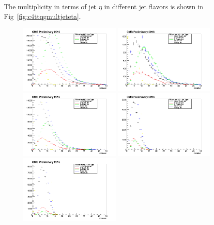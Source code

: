The multiplicity in terms of jet $\eta$ in different jet flavors is shown in Fig~\ref{fig:c4ttqgmultjeteta}.
\begin{figure}[htbp]
 \begin{center}
  \includegraphics[width=0.45\textwidth]{sections/mc4/TopTagger/figures/_b_qgmultjetetabin0_.png}
  \includegraphics[width=0.45\textwidth]{sections/mc4/TopTagger/figures/_b_qgmultjetetabin1_.png} \\
  \includegraphics[width=0.45\textwidth]{sections/mc4/TopTagger/figures/_b_qgmultjetetabin2_.png}
  \includegraphics[width=0.45\textwidth]{sections/mc4/TopTagger/figures/_b_qgmultjetetabin3_.png} \\
  \includegraphics[width=0.45\textwidth]{sections/mc4/TopTagger/figures/_b_qgmultjetetabin4_.png}

\end{center}
\end{figure}
